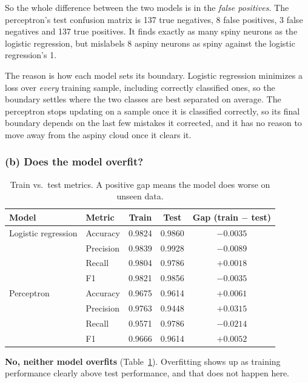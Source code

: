 \documentclass[11pt]{article}
\begin{document}
So the whole difference between the two models is in the \emph{false positives}. The perceptron's test confusion matrix is 137 true negatives, 8 false positives, 3 false negatives and 137 true positives. It finds exactly as many spiny neurons as the logistic regression, but mislabels 8 aspiny neurons as spiny against the logistic regression's 1.

The reason is how each model sets its boundary. Logistic regression minimizes a loss over \emph{every} training sample, including correctly classified ones, so the boundary settles where the two classes are best separated on average. The perceptron stops updating on a sample once it is classified correctly, so its final boundary depends on the last few mistakes it corrected, and it has no reason to move away from the aspiny cloud once it clears it.

\FloatBarrier
\subsubsection*{(b) Does the model overfit?}

\begin{table}[H]
\centering
\caption{Train vs.\ test metrics. A positive gap means the model does worse on unseen data.}
\label{tab:q2b}
\small
\begin{tabular}{llccc}
\toprule
Model & Metric & Train & Test & Gap (train $-$ test) \\
\midrule
Logistic regression & Accuracy  & 0.9824 & 0.9860 & $-0.0035$ \\
                    & Precision & 0.9839 & 0.9928 & $-0.0089$ \\
                    & Recall    & 0.9804 & 0.9786 & $+0.0018$ \\
                    & F1        & 0.9821 & 0.9856 & $-0.0035$ \\
\midrule
Perceptron          & Accuracy  & 0.9675 & 0.9614 & $+0.0061$ \\
                    & Precision & 0.9763 & 0.9448 & $+0.0315$ \\
                    & Recall    & 0.9571 & 0.9786 & $-0.0214$ \\
                    & F1        & 0.9666 & 0.9614 & $+0.0052$ \\
\bottomrule
\end{tabular}
\end{table}

\textbf{No, neither model overfits} (Table~\ref{tab:q2b}). Overfitting shows up as training performance clearly above test performance, and that does not happen here.
\end{document}
